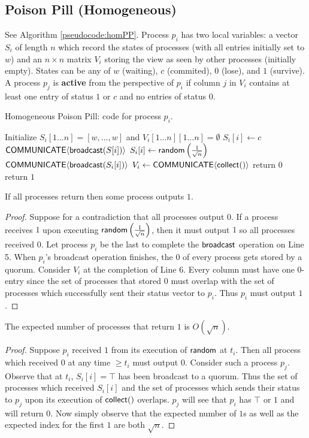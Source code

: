 \documentclass[
10pt, %
a4paper, %
onecolumn, %
]{article}
\begin{document}
\subsection{Poison Pill (Homogeneous)}
See Algorithm \ref{pseudocode:homPP}. Process $p_i$ has two local variables: a vector $S_i$ of length $n$ which record the states of processes (with all entries initially set to $w$) and an $n\times n$ matrix $V_i$ storing the view as seen by other processes (initially empty). States can be any of $w$ (waiting), $c$ (commited), $0$ (lose), and $1$ (survive). A process $p_j$ is \textbf{active} from the perspective of $p_i$ if column $j$ in $V_i$ contains at least one entry of status $1$ or $c$ and no entries of status $0$.  
\begin{algorithm}[ht]
	\caption{Homogeneous Poison Pill: code for process $p_i$.}
    \label{pseudocode:homPP}
    \begin{algorithmic}[1]
    \State Initialize $S_i[1...n] = [w, ... ,w]$ and $V_i[1...n][1...n] = \emptyset$
	\State $S_i[i] \leftarrow c$
	\State $\mathsf{COMMUNICATE}\langle\mathsf{broadcast}(S[i])\rangle$
	\State $S_i[i] \leftarrow \mathsf{random}\left(\frac{1}{\sqrt{n}}\right)$
	\State $\mathsf{COMMUNICATE}\langle\mathsf{broadcast}(S_i[i])\rangle$
	\State $V_i \leftarrow \mathsf{COMMUNICATE}\langle\mathsf{collect}()\rangle$
		\State return $0$
	\EndIf
	\State return $1$ 
	\end{algorithmic}
\end{algorithm}

\begin{claim}
If all processes return then some process outputs $1$.
\end{claim}
\begin{proof}
Suppose for a contradiction that all processes output $0$. If a process receives $1$ upon executing $\mathsf{random}\left(\frac{1}{\sqrt{n}}\right)$, then it must output $1$ so all processes received $0$. Let process $p_i$ be the last to complete the $\mathsf{broadcast}$ operation on Line 5. When $p_i$'s broadcast operation finishes, the $0$ of every process gets stored by a quorum. Consider $V_i$ at the completion of Line 6. Every column must have one $0$-entry since the set of processes that stored $0$ must overlap with the set of processes which successfully sent their status vector to $p_i$. Thus $p_i$ must output $1$. 
\end{proof}

\begin{claim}
The expected number of processes that return $1$ is $O(\sqrt{n})$.
\end{claim}
\begin{proof}
Suppose $p_i$ received $1$ from its execution of $\mathsf{random}$ at $t_i$. Then all process which received $0$ at any time $\geq t_i$ must output $0$. Consider such a process $p_j$. Observe that at $t_i$, $S_i[i] = \top$ has been broadcast to a quorum. Thus the set of processes which received $S_i[i]$ and the set of processes which sends their status to $p_j$ upon its execution of $\mathsf{collect}()$ overlaps. $p_j$ will see that $p_i$ has $\top$ or $1$ and will return $0$. Now simply observe that the expected number of $1$s as well as the expected index for the first $1$ are both $\sqrt{n}$.  
\end{proof}
\end{document}
